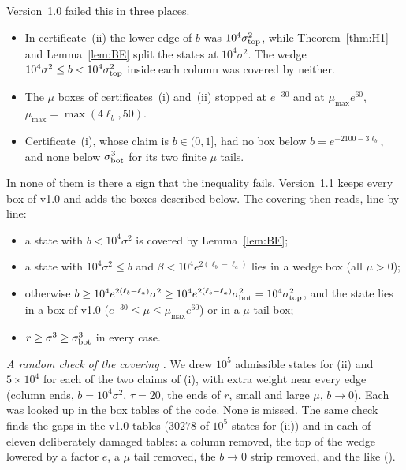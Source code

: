 Version~1.0 failed this in three places.
\begin{itemize}
\item In certificate~(ii) the lower edge of $b$ was $10^4\sigma_{\rm top}^2$, while Theorem~\ref{thm:H1} and Lemma~\ref{lem:BE} split the states at $10^4\sigma^2$.
  The wedge $10^4\sigma^2\le b<10^4\sigma_{\rm top}^2$ inside each column was covered by neither.
\item The $\mu$ boxes of certificates~(i) and~(ii) stopped at $e^{-30}$ and at $\mu_{\max}e^{60}$, $\mu_{\max}=\max(4\ell_b,50)$.
\item Certificate~(i), whose claim is $b\in(0,1]$, had no box below $b=e^{-2100-3\ell_b}$, and none below $\sigma_{\rm bot}^3$ for its two finite $\mu$ tails.
\end{itemize}
In none of them is there a sign that the inequality fails.
Version~1.1 keeps every box of v1.0 and adds the boxes described below.
The covering then reads, line by line:
\begin{itemize}
\item a state with $b<10^4\sigma^2$ is covered by Lemma~\ref{lem:BE};
\item a state with $10^4\sigma^2\le b$ and $\beta<10^4e^{2(\ell_b-\ell_a)}$ lies in a wedge box (all $\mu>0$);
\item otherwise $b\ge10^4e^{2(\ell_b-\ell_a)}\sigma^2\ge10^4e^{2(\ell_b-\ell_a)}\sigma_{\rm bot}^2=10^4\sigma_{\rm top}^2$, and the state lies in a box of v1.0 ($e^{-30}\le\mu\le\mu_{\max}e^{60}$) or in a $\mu$ tail box;
\item $r\ge\sigma^3\ge\sigma_{\rm bot}^3$ in every case.
\end{itemize}
\emph{A random check of the covering \numst.}
We drew $10^5$ admissible states for (ii) and $5\times10^4$ for each of the two claims of (i), with extra weight near every edge (column ends, $b=10^4\sigma^2$, $\tau=20$, the ends of $r$, small and large $\mu$, $b\to0$).
Each was looked up in the box tables of the code.
None is missed.
The same check finds the gaps in the v1.0 tables ($30278$ of $10^5$ states for (ii)) and in each of eleven deliberately damaged tables: a column removed, the top of the wedge lowered by a factor $e$, a $\mu$ tail removed, the $b\to0$ strip removed, and the like ().

